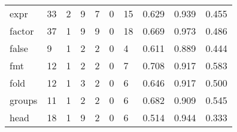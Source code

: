 \begin{longtable}{lp{2.0cm}p{2.0cm}p{2.0cm}p{2.0cm}p{2.0cm}p{2.0cm}p{2.0cm}p{2.0cm}p{2.0cm}}
expr      &                     33 &                                             2 &                                            9 &                                           7 &                                            0 &                                         15 &                                0.629 &                                  0.939 &                                0.455 \\
factor    &                     37 &                                             1 &                                            9 &                                           9 &                                            0 &                                         18 &                                0.669 &                                  0.973 &                                0.486 \\
false     &                      9 &                                             1 &                                            2 &                                           2 &                                            0 &                                          4 &                                0.611 &                                  0.889 &                                0.444 \\
fmt       &                     12 &                                             1 &                                            2 &                                           2 &                                            0 &                                          7 &                                0.708 &                                  0.917 &                                0.583 \\
fold      &                     12 &                                             1 &                                            3 &                                           2 &                                            0 &                                          6 &                                0.646 &                                  0.917 &                                0.500 \\
groups    &                     11 &                                             1 &                                            2 &                                           2 &                                            0 &                                          6 &                                0.682 &                                  0.909 &                                0.545 \\
head      &                     18 &                                             1 &                                            9 &                                           2 &                                            0 &                                          6 &                                0.514 &                                  0.944 &                                0.333 \\

\end{longtable}
